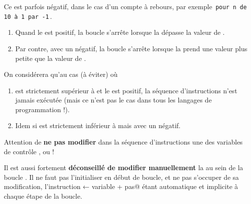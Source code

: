 \documentclass[11pt,a4paper]{article}
\begin{document}
            \par
        
        Ce \verb@pas@ est parfois n\'egatif, dans le cas d'un compte \`a rebours, 
        par exemple \,\verb|pour n de 10 à 1 par -1|\,.
      
            \par
        
					\begin{enumerate}
				
			\item 
            Quand le \verb@pas@ est positif, 
            la boucle s'arr\^ete lorsque la \verb@variable@ 
            d\'epasse la valeur de \verb@fin@.
          
			\item 
            Par contre, avec un \verb@pas@ n\'egatif, 
            la boucle s'arr\^ete lorsque la \verb@variable@ 
            prend une valeur plus petite que la valeur de \verb@fin@.
          
					\end{enumerate}
				
            \par
        
        On consid\'erera qu'au cas (\`a \'eviter) o\`u
        
					\begin{enumerate}
				
			\item {} est strictement sup\'erieur \`a \verb@fin@ 
            et le \verb@pas@ est positif, la s\'equence d'instructions n'est
            jamais ex\'ecut\'ee (mais ce n'est pas le cas dans tous les langages de programmation !). 
          
			\item 
            Idem si  est strictement inf\'erieur \`a \verb@fin@ 
            mais avec un \verb@pas@ n\'egatif.
          
					\end{enumerate}
				
            \par
        
        Attention de \textbf{ne pas modifier} dans la s\'equence d'instructions une des variables de contr\^ole
        , \verb@fin@ ou \verb@pas@ ! 
      
            \par
        
        Il est aussi fortement \textbf{d\'econseill\'e de modifier \guillemotleft  manuellement }\guillemotright  
        la \verb@variable@ 
        au sein de la boucle \verb@pour@. 
        Il ne faut pas l'initialiser en d\'ebut de boucle, et ne pas s'occuper de sa modification,
         l'instruction \verb@variable ← variable + pas@ \'etant automatique
        et implicite \`a chaque \'etape de la boucle. 
      
\end{document}
